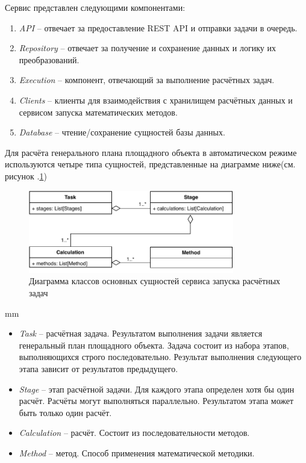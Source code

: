 Сервис представлен следующими компонентами:
\begin{enumerate}
	\item {
		\textit{API} -- отвечает за предоставление REST API и отправки задачи в очередь.
	}
	\item {
		\textit{Repository} -- отвечает за получение и сохранение данных и логику их преобразований.
	}
	\item {
		\textit{Execution} -- компонент, отвечающий за выполнение расчётных задач.
	}
	\item {
		\textit{Clients} -- клиенты для взаимодействия с хранилищем расчётных данных
		и сервисом запуска математических методов.
	}
	\item {
		\textit{Database} -- чтение/сохранение сущностей базы данных.
	}
\end{enumerate}

Для расчёта генерального плана площадного объекта в автоматическом режиме используются четыре типа сущностей,
представленные на диаграмме ниже(см. рисунок .\ref{pic:architecture__orchestrator-classes})

\begin{figure}[H]
	\includegraphics[width=0.8\textwidth]{pictures/classes}
	\caption{Диаграмма классов основных сущностей сервиса запуска расчётных задач}
	\label{pic:architecture__orchestrator-classes}
\end{figure}
 mm

\begin{itemize}
	\item {
		\textit{Task} -- расчётная задача.
		Результатом выполнения задачи является генеральный план площадного объекта.
		Задача состоит из набора этапов, выполняющихся строго последовательно.
		Результат выполнения следующего этапа зависит от результатов предыдущего.
	}
	\item {
		\textit{Stage} -- этап расчётной задачи.
		Для каждого этапа определен хотя бы один расчёт.
		Расчёты могут выполняться параллельно.
		Результатом этапа может быть только один расчёт.
	}
	\item {
		\textit{Calculation} -- расчёт. Состоит из последовательности методов.
	}
	\item {
		\textit{Method} -- метод. Способ применения математической методики.
	}
\end{itemize}

